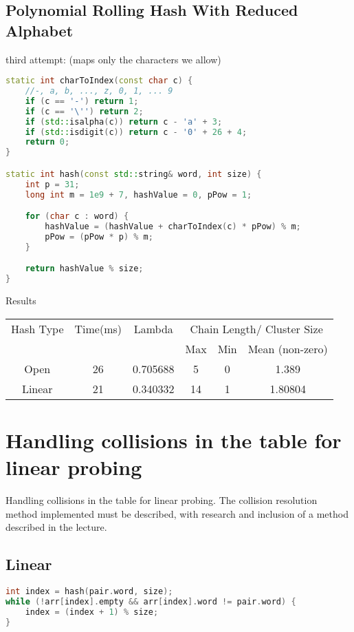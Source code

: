 \documentclass[12pt]{article}
\begin{document}
\subsection{Polynomial Rolling Hash With Reduced Alphabet}

third attempt: (maps only the characters we allow)
\begin{lstlisting}[language=C++]
static int charToIndex(const char c) {
    //-, a, b, ..., z, 0, 1, ... 9
    if (c == '-') return 1;
    if (c == '\'') return 2;
    if (std::isalpha(c)) return c - 'a' + 3;
    if (std::isdigit(c)) return c - '0' + 26 + 4;
    return 0;
}

static int hash(const std::string& word, int size) {
    int p = 31;
    long int m = 1e9 + 7, hashValue = 0, pPow = 1;

    for (char c : word) {
        hashValue = (hashValue + charToIndex(c) * pPow) % m;
        pPow = (pPow * p) % m;
    }

    return hashValue % size;
}
\end{lstlisting}

\begin{center}
Results\\
\begin{tabular}{|c|c|c|c|c|c|}
\hline
Hash Type & Time(ms) & Lambda & \multicolumn{3}{|c|}{Chain Length/ Cluster Size} \\
 & & & Max & Min & Mean (non-zero) \\
\hline
Open & 26 & 0.705688 & 5 & 0 & 1.389\\
Linear & 21 & 0.340332 & 14 & 1 & 1.80804\\
\hline
\end{tabular}
\end{center}

\section{Handling collisions in the table for linear probing}
Handling collisions in the table for linear probing. The collision resolution method implemented must be
described, with research and inclusion of a method described in the lecture.

\subsection{Linear}
\begin{lstlisting}[language=C++]
int index = hash(pair.word, size);
while (!arr[index].empty && arr[index].word != pair.word) {
    index = (index + 1) % size;
}
\end{lstlisting}
\end{document}
